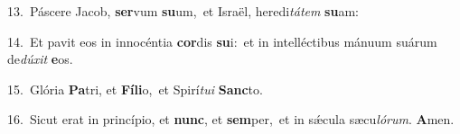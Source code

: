 {\numbfont\textcolor{\numbcolor}{13.}}~Páscere Jacob, \textbf{ser}\-vum \textbf{su}\-um,~\star et Israël, heredi\-\textit{tá}\-\textit{tem} \textbf{su}\-am:\par
{\numbfont\textcolor{\numbcolor}{14.}}~Et pavit eos in innocéntia \textbf{cor}\-dis \textbf{su}\-i:~\star et in intelléctibus mánuum suárum de\-\textit{dú}\-\textit{xit} \textbf{e}\-os.\par
{\numbfont\textcolor{\numbcolor}{15.}}~Glória \textbf{Pa}\-tri, et \textbf{Fí}\-\textbf{li}o,~\star et Spirí\-\textit{tu}\-\textit{i} \textbf{Sanc}\-to.\par
{\numbfont\textcolor{\numbcolor}{16.}}~Sicut erat in princípio, et \textbf{nunc}\-, et \textbf{sem}\-per,~\star et in sǽcula sæcu\-\textit{ló}\-\textit{rum}. \textbf{A}\-men.\par
